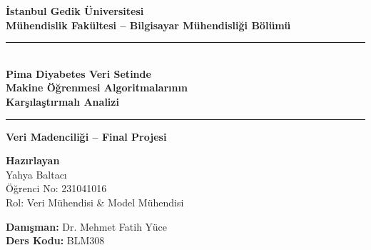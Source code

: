 \documentclass[12pt,a4paper]{article}
\begin{document}
\begin{titlepage}
  \centering
  \vspace*{1cm}

  {\Large\bfseries\color{pblue}İstanbul Gedik Üniversitesi\\[0.3em]
   \normalsize Mühendislik Fakültesi -- Bilgisayar Mühendisliği Bölümü}

  \vspace{1.5cm}
  {\color{pblue}\rule{\linewidth}{1.5pt}}\\[0.4em]
  {\huge\bfseries\color{pblue}
    Pima Diyabetes Veri Setinde\\[0.3em]
    Makine Öğrenmesi Algoritmalarının\\[0.3em]
    Karşılaştırmalı Analizi}\\[0.4em]
  {\color{pblue}\rule{\linewidth}{1.5pt}}

  \vspace{0.8cm}
  {\large\bfseries Veri Madenciliği -- Final Projesi}

  \vspace{1.2cm}
  \begin{tcolorbox}[
      colback=lgray,
      colframe=ablue,
      boxrule=1pt,
      arc=4pt,
      width=0.6\linewidth,
      halign=center
    ]
    \textbf{Hazırlayan}\\[0.4em]
    {\large Yahya Baltacı}\\[0.3em]
    Öğrenci No: 231041016\\[0.3em]
    Rol: Veri Mühendisi \& Model Mühendisi
  \end{tcolorbox}

  \vspace{0.8cm}
  \textbf{Danışman:} Dr. Mehmet Fatih Yüce\\[0.4em]
  \textbf{Ders Kodu:} BLM308

  \vspace{0.6cm}


\end{titlepage}
\end{document}

